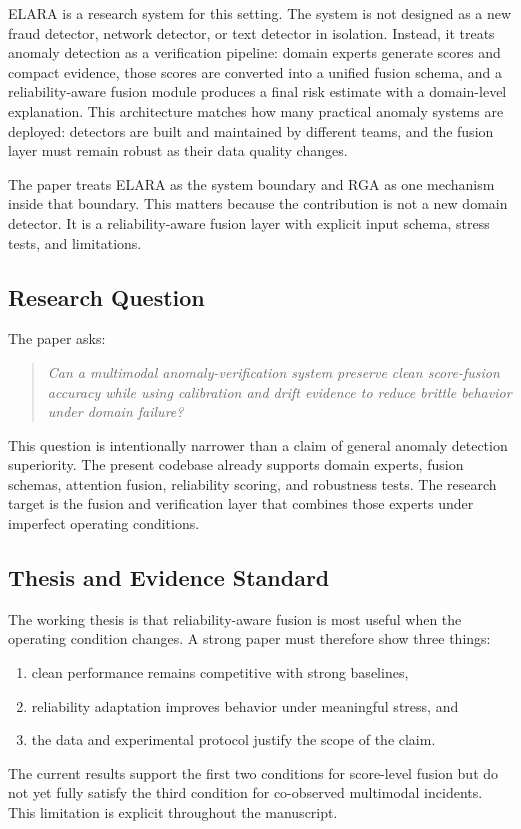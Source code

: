 \documentclass[10pt,conference]{IEEEtran}
\newcommand{\system}{ELARA}
\newcommand{\method}{RGA}
\begin{document}
\system{} is a research system for this setting. The system is not designed as a
new fraud detector, network detector, or text detector in isolation. Instead,
it treats anomaly detection as a verification pipeline: domain experts generate
scores and compact evidence, those scores are converted into a unified fusion
schema, and a reliability-aware fusion module produces a final risk estimate
with a domain-level explanation. This architecture matches how many practical
anomaly systems are deployed: detectors are built and maintained by different
teams, and the fusion layer must remain robust as their data quality changes.

The paper treats \system{} as the system boundary and \method{} as one
mechanism inside that boundary. This matters because the contribution is not a
new domain detector. It is a reliability-aware fusion layer with explicit input
schema, stress tests, and limitations.

\subsection{Research Question}
The paper asks:
\begin{quote}
\emph{Can a multimodal anomaly-verification system preserve clean score-fusion
accuracy while using calibration and drift evidence to reduce brittle behavior
under domain failure?}
\end{quote}

This question is intentionally narrower than a claim of general anomaly
detection superiority. The present codebase already supports domain experts,
fusion schemas, attention fusion, reliability scoring, and robustness tests.
The research target is the fusion and verification layer that combines those
experts under imperfect operating conditions.

\subsection{Thesis and Evidence Standard}
The working thesis is that reliability-aware fusion is most useful when the
operating condition changes. A strong paper must therefore show three things:
\begin{enumerate}
  \item clean performance remains competitive with strong baselines,
  \item reliability adaptation improves behavior under meaningful stress, and
  \item the data and experimental protocol justify the scope of the claim.
\end{enumerate}
The current results support the first two conditions for score-level fusion but
do not yet fully satisfy the third condition for co-observed multimodal
incidents. This limitation is explicit throughout the manuscript.
\end{document}
